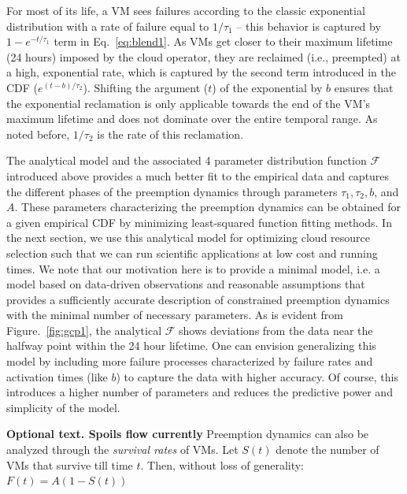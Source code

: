 For most of its life, a VM sees failures according to the classic exponential distribution with a rate of failure equal to $1/\tau_1$ -- this behavior is captured by $1-e^{-t/\tau_1}$ term in Eq.~\ref{eq:blend1}. 
As VMs get closer to their maximum lifetime (24 hours) imposed by the cloud operator, they are reclaimed (i.e., preempted) at a high, exponential rate, which is captured by the second term introduced in the CDF ($e^{(t-b)/\tau_2}$). 
Shifting the argument ($t$) of the exponential by $b$ ensures that the exponential reclamation is only applicable towards the end of the VM's maximum lifetime and does not dominate over the entire temporal range. As noted before, $1/\tau_2$ is the rate of this reclamation.

The analytical model and the associated 4 parameter distribution function $\mathscr{F}$ introduced above provides a much better fit to the empirical data and captures the different phases of the preemption dynamics through parameters $\tau_1, \tau_2, b$, and $A$. These parameters characterizing the preemption dynamics can be obtained for a given empirical CDF by minimizing least-squared function fitting methods. \footnotemark 
%
%
In the next section, we use this analytical model for optimizing cloud resource selection such that we can run scientific applications at low cost and running times. We note that our motivation here is to provide a minimal model, i.e. a model based on data-driven observations and reasonable assumptions that provides a sufficiently accurate description of constrained preemption dynamics with the minimal number of necessary parameters. As is evident from Figure.~\ref{fig:gcp1}, the analytical $\mathscr{F}$ shows deviations from the data near the halfway point within the 24 hour lifetime. One can envision generalizing this model by including more failure processes characterized by failure rates and activation times (like $b$) to capture the data with higher accuracy. Of course, this introduces a higher number of parameters and reduces the predictive power and simplicity of the model. 



\textbf{Optional text. Spoils flow currently}
Preemption dynamics can also be analyzed through the \emph{survival rates} of VMs.
Let $S(t)$ denote the number of VMs that survive till time $t$.
Then, without loss of generality: $F(t) = A(1-S(t))$


